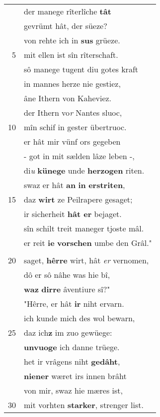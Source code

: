 \documentclass[8pt,a4paper,notitlepage]{article}
\begin{document}
\begin{table}[ht]
\begin{minipage}[t]{0.5\linewidth}
\begin{tabular}{rl}
 & der manege rîterlîche \textbf{tât}\\ 
 & gevrümt hât, der süeze?\\ 
 & von rehte ich in \textbf{sus} grüeze.\\ 
5 & mit ellen ist sîn rîterschaft.\\ 
 & sô manege tugent diu gotes kraft\\ 
 & in mannes herze nie gestiez,\\ 
 & âne Ithern von Kaheviez.\\ 
 & der Ithern vo\textit{r} Nantes sluoc,\\ 
10 & mîn schif in gester übertruoc.\\ 
 & er hât mir vünf ors gegeben\\ 
 & - got in mit sælden lâze leben -,\\ 
 & di\textit{u} \textbf{künege} unde \textbf{herzogen} riten.\\ 
 & swaz er hât \textbf{an} \textbf{in} \textbf{erstriten},\\ 
15 & daz \textbf{wirt} ze Peilrapere gesaget;\\ 
 & ir sicherheit \textbf{hât er} bejaget.\\ 
 & sîn schilt treit maneger tjoste mâl.\\ 
 & er reit \textbf{ie} \textbf{vorschen} umbe den Grâl."\\ 
 & \textit{\begin{large}G\end{large}}awan sprach: "war ist \textbf{der} komen?\\ 
20 & saget, \textbf{hêrre} wirt, hât \textit{er} vernomen,\\ 
 & dô er sô nâhe was hie bî,\\ 
 & \textbf{waz} \textbf{dirre} âventiure sî?"\\ 
 & "Hêrre, er hât \textbf{ir} niht ervarn.\\ 
 & ich kunde mich des wol bewarn,\\ 
25 & daz ich\textbf{z} im zuo gewüege:\\ 
 & \textbf{unvuoge} ich danne trüege.\\ 
 & het ir vrâgens niht \textbf{gedâht},\\ 
 & \textbf{niener} wæret irs innen brâht\\ 
 & von mir, swaz hie mæres ist,\\ 
30 & mit vorhten \textbf{starker}, strenger list.\\ 
\end{tabular}
\scriptsize

\end{minipage}
\end{table}
\end{document}
